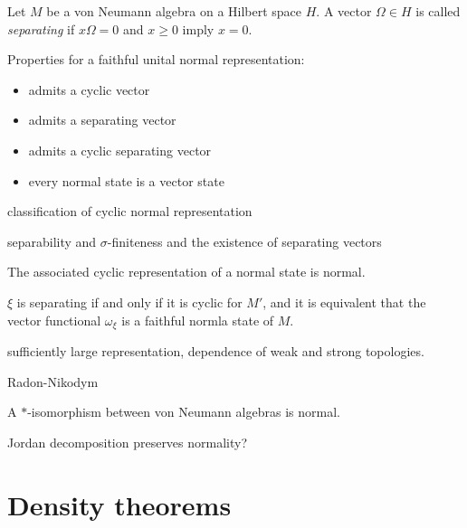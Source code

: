 \documentclass{../../large}
\begin{document}
\begin{prb}
Let $M$ be a von Neumann algebra on a Hilbert space $H$.
A vector $\Omega\in H$ is called \emph{separating} if $x\Omega=0$ and $x\ge0$ imply $x=0$.

Properties for a faithful unital normal representation:
\begin{itemize}
\item admits a cyclic vector
\item admits a separating vector
\item admits a cyclic separating vector
\item every normal state is a vector state
\end{itemize}

classification of cyclic normal representation

separability and $\sigma$-finiteness and the existence of separating vectors

\begin{parts}
\item The associated cyclic representation of a normal state is normal.
\item $\xi$ is separating if and only if it is cyclic for $M'$, and it is equivalent that the vector functional $\omega_\xi$ is a faithful normla state of $M$.
\item sufficiently large representation, dependence of weak and strong topologies.
\item Radon-Nikodym
\end{parts}
\end{prb}


A $*$-isomorphism between von Neumann algebras is normal.


\begin{prb}
Jordan decomposition preserves normality?
\end{prb}


\section{Density theorems}
\end{document}
